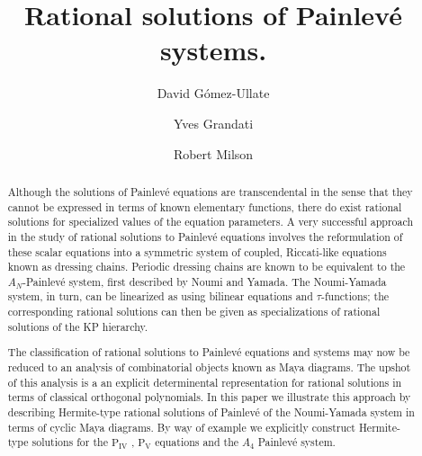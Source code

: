\documentclass{amsart}
\theoremstyle{definition}
\newcommand{\PIV}{$\mathrm{P}_{\mathrm{IV}}\,\,$}
\newcommand{\PV}{$\mathrm{P}_{\mathrm{V}}\,\,$}
\begin{document}
\thispagestyle{empty}


\title{Rational solutions of Painlev\'e systems.}
\author{David G\'omez-Ullate}
\address{Escuela Superior de Ingenier\'ia, Universidad de C\'adiz, 11519 Puerto Real, Spain.}
 \address{Escuela Superior de Ingenier\'ia, Universidad de C\'adiz,  Avda. Universidad de C\'adiz, Campus Universitario de Puerto Real, 11519, Spain.}
\author{Yves Grandati}
\address{ Laboratoire de Physique et Chimie Th\'eoriques, Universit\'e de Lorraine, 57078 Metz, Cedex 3, France.}
\author{Robert Milson}
\address{Department of Mathematics and Statistics, Dalhousie University,
  Halifax, NS, B3H 3J5, Canada.}


\begin{abstract}
  \noindent
  Although the solutions of Painlev\'e equations are transcendental in
  the sense that they cannot be expressed in terms of known elementary
  functions, there do exist rational solutions for specialized values
  of the equation parameters.  A very successful approach in the study
  of rational solutions to Painlev\'e equations involves the
  reformulation of these scalar equations into a symmetric system of
  coupled, Riccati-like equations known as dressing chains.  Periodic
  dressing chains are known to be equivalent to the $A_N$-Painlev\'e
  system, first described by Noumi and Yamada.  The Noumi-Yamada
  system, in turn, can be linearized as using bilinear equations and
  $\tau$-functions; the corresponding rational solutions can then be
  given as specializations of rational solutions of the KP hierarchy.

  The classification of rational solutions to Painlev\'e equations and
  systems may now be reduced to an analysis of combinatorial objects
  known as Maya diagrams.  The upshot of this analysis is a an
  explicit determinental representation for rational solutions in
  terms of classical orthogonal polynomials.  In this paper we
  illustrate this approach by describing Hermite-type rational
  solutions of Painlev\'e of the Noumi-Yamada system in terms of
  cyclic Maya diagrams.  By way of example we explicitly construct
  Hermite-type solutions for the \PIV, \PV equations and the $A_4$
  Painlev\'e system.
\end{abstract}



\maketitle
\end{document}
